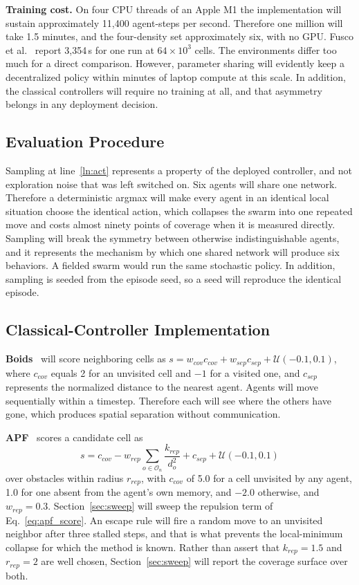 \documentclass[a4paper, 10pt, conference]{ieeeconf}
\begin{document}
\textbf{Training cost.} On four CPU threads of an Apple M1 the
implementation will sustain approximately 11{,}400 agent-steps per
second. Therefore one million will take 1.5 minutes, and the
four-density set approximately six, with no GPU. Fusco et
al.~\cite{fusco2025} report 3{,}354\,s for one run at $64\times10^3$
cells. The environments differ too much for a direct comparison.
However, parameter sharing will evidently keep a decentralized policy
within minutes of laptop compute at this scale. In addition, the
classical controllers will require no training at all, and that
asymmetry belongs in any deployment decision.

\subsection{Evaluation Procedure}\label{sec:eval}

Sampling at line~\ref{ln:act} represents a property of the deployed
controller, and not exploration noise that was left switched on. Six
agents will share one network. Therefore a deterministic argmax will
make every agent in an identical local situation choose the identical
action, which collapses the swarm into one repeated move and costs
almost ninety points of coverage when it is measured directly.
Sampling will break the symmetry between otherwise indistinguishable
agents, and it represents the mechanism by which one shared network
will produce six behaviors. A fielded swarm would run the same
stochastic policy. In addition, sampling is seeded from the episode
seed, so a seed will reproduce the identical episode.

\subsection{Classical-Controller Implementation}\label{sec:classical}

\textbf{Boids}~\cite{reynolds1987} will score neighboring cells as $s
= w_{cov}c_{cov} + w_{sep}c_{sep} + \mathcal{U}(-0.1,0.1)$, where
$c_{cov}$ equals 2 for an unvisited cell and $-1$ for a visited one,
and $c_{sep}$ represents the normalized distance to the nearest agent.
Agents will move sequentially within a timestep. Therefore each will
see where the others have gone, which produces spatial separation
without communication.

\textbf{APF}~\cite{khatib1986} scores a candidate cell as
\begin{equation}\label{eq:apf_score}
    s = c_{cov}
      - w_{rep} \!\!\sum_{o \in \mathcal{O}_{n}} \frac{k_{rep}}{d_o^2}
      + c_{sep} + \mathcal{U}(-0.1, 0.1)
\end{equation}
over obstacles within radius $r_{rep}$, with $c_{cov}$ of 5.0 for a
cell unvisited by any agent, 1.0 for one absent from the agent's own
memory, and $-2.0$ otherwise, and $w_{rep}=0.3$.
Section~\ref{sec:sweep} will sweep the repulsion term of
Eq.~\ref{eq:apf_score}. An escape rule will fire a random move to an
unvisited neighbor after three stalled steps, and that is what
prevents the local-minimum collapse for which the method is known.
Rather than assert that $k_{rep}=1.5$ and $r_{rep}=2$ are well chosen,
Section~\ref{sec:sweep} will report the coverage surface over both.
\end{document}
